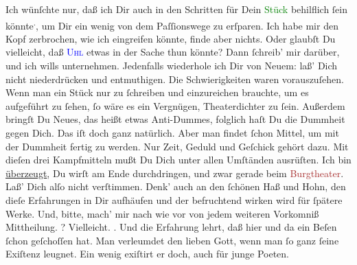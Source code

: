 \pstart
           Ich wünſchte nur, daß ich Dir auch in den Schritten für Dein \textcolor{green}{Stück}{}\ledrightnote{{$\rightarrow$}\textcolor{green}{Liebelei. Schauspiel in drei Akten}} behilflich ſein könnte\substVorne{}\textsuperscript{.}\substDazwischen{},\substHinten{} um Dir ein wenig von dem Paſſionswege zu erſparen. Ich habe mir den Kopf
               zerbrochen, wie ich eingreifen könnte, finde aber nichts. Oder glaubſt Du vielleicht,
               daß {\pb}\textsc{\textcolor{blue}{Uhl}{}\ledrightnote{\textcolor{blue}{Friedrich Uhl}}} etwas in der Sache thun könnte? Dann ſchreib’ mir darüber, und ich wills
               unternehmen. Jedenfalls wiederhole ich Dir von Neuem: laß’ Dich nicht niederdrücken
               und entmuthigen. Die Schwierigkeiten waren vorauszuſehen. Wenn man ein Stück nur zu
               ſchreiben und einzureichen brauchte, um es aufgeführt zu ſehen, ſo wäre es ein
               Vergnügen, Theaterdichter zu ſein. Außerdem bringſt Du Neues, das heißt etwas
               Anti-Dummes, folglich haſt Du die Dummheit gegen Dich. Das iſt doch ganz natürlich.
               Aber man findet ſchon Mittel, {\pb}um mit der Dummheit
               fertig zu werden. Nur Zeit, Geduld und Geſchick gehört dazu. Mit dieſen drei
               Kampfmitteln \strikeout{\textcolor{gray}{we}} mußt Du Dich unter allen Umſtänden ausrüſten. Ich bin \uline{überzeugt}, Du wirſt am Ende durchdringen, und zwar gerade beim \textcolor{brown}{Burgtheater}{}\ledrightnote{\textcolor{brown}{Burgtheater}}. Laß’ Dich alſo nicht verſtimmen.
               Denk’ auch an den ſchönen Haß und Hohn, den dieſe Erfahrungen in Dir aufhäufen und
               der befruchtend wirken wird für  ſpätere Werke.
               Und, bitte, mach’ mir nach wie vor von jedem weiteren Vorkomniß Mittheilung. \label{K_L02622-6v}\label{K_L02622-6h}? {\pb}Vielleicht. \label{K_L02622-7v}\label{K_L02622-7h}. Und die Erfahrung lehrt, daß
               hier und da ein Beſen ſchon geſchoſſen hat. Man 
               verleumdet den lieben Gott, wenn man ſo ganz ſeine Exiſtenz leugnet. Ein wenig
               exiſtirt er doch, auch für junge Poeten.\pend
           

